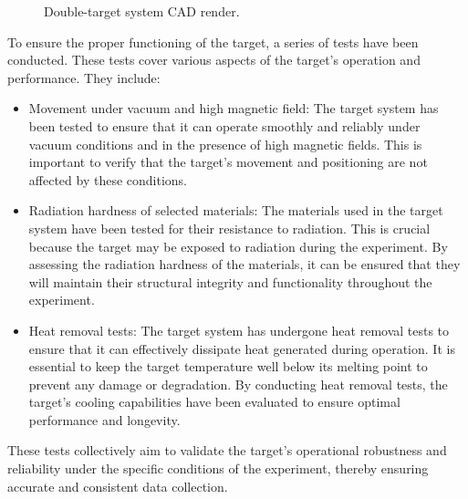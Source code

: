     \begin{figure}[b!]
        \caption[Double-target system.]
        {Double-target system CAD render.}
        \label{fig::11.300::double_target}
    \end{figure}

    To ensure the proper functioning of the target, a series of tests have been conducted.
    These tests cover various aspects of the target's operation and performance.
    They include:

    \begin{itemize}
        \item
            Movement under vacuum and high magnetic field:
            The target system has been tested to ensure that it can operate smoothly and reliably under vacuum conditions and in the presence of high magnetic fields.
            This is important to verify that the target's movement and positioning are not affected by these conditions.

        \item
            Radiation hardness of selected materials:
            The materials used in the target system have been tested for their resistance to radiation.
            This is crucial because the target may be exposed to radiation during the experiment.
            By assessing the radiation hardness of the materials, it can be ensured that they will maintain their structural integrity and functionality throughout the experiment.

        \item
            Heat removal tests:
            The target system has undergone heat removal tests to ensure that it can effectively dissipate heat generated during operation.
            It is essential to keep the target temperature well below its melting point to prevent any damage or degradation.
            By conducting heat removal tests, the target's cooling capabilities have been evaluated to ensure optimal performance and longevity.
    \end{itemize}

    These tests collectively aim to validate the target's operational robustness and reliability under the specific conditions of the experiment, thereby ensuring accurate and consistent data collection.

    
